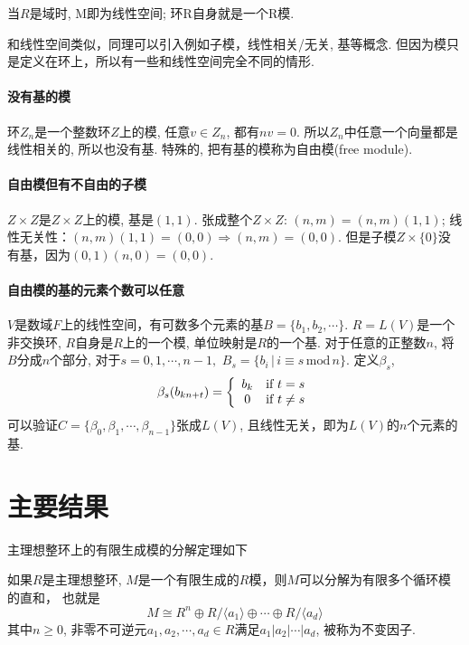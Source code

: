 \begin{remark}
	当$R$是域时, M即为线性空间; 环R自身就是一个R模.
\end{remark}

和线性空间类似，同理可以引入例如子模，线性相关/无关, 基等概念.
但因为模只是定义在环上，所以有一些和线性空间完全不同的情形.

\paragraph{没有基的模}
环$Z_n$是一个整数环$Z$上的模, 任意$v \in Z_n$, 都有$nv = 0$.
所以$Z_n$中任意一个向量都是线性相关的, 所以也没有基.
特殊的, 把有基的模称为自由模(free module).

\paragraph{自由模但有不自由的子模}
$Z\times Z$是$Z \times Z$上的模, 基是$(1,1)$.
张成整个$Z\times Z$: $(n,m)=(n,m)(1,1)$;
线性无关性：$(n,m)(1,1)=(0,0) \Rightarrow (n,m)=(0,0)$.
但是子模$Z \times \{0\}$没有基，因为$(0,1)(n,0) = (0,0)$.

\paragraph{自由模的基的元素个数可以任意}
$V$是数域$F$上的线性空间，有可数多个元素的基$B = \{b_1, b_2, \cdots\}$.
$R=L(V)$是一个非交换环, $R$自身是$R$上的一个模, 单位映射是$R$的一个基.
对于任意的正整数$n$, 将$B$分成$n$个部分, 对于$s=0,1,\cdots,n-1,$ 
$B_s = \{b_i \,|\, i \equiv s \,\mathrm{mod}\, n\}$.
定义$\beta_s$,
\begin{equation}
\nonumber
\beta_s(b_{kn+t}) = 
\left\{
\begin{array}[]{cc}
	b_k& \text{if } t = s\\
	0  & \text{if } t \ne s\\
\end{array}
\right.
\end{equation}
可以验证$C=\{\beta_0, \beta_1, \cdots, \beta_{n-1}\}$张成$L(V)$,
且线性无关，即为$L(V)$的$n$个元素的基.

\section{主要结果}
主理想整环上的有限生成模的分解定理如下
\begin{theorem}
如果$R$是主理想整环, $M$是一个有限生成的$R$模，则$M$可以分解为有限多个循环模的直和，
也就是
\begin{equation}
M \cong R^n \oplus R/\langle a_1 \rangle \oplus \cdots 
\oplus R/\langle a_d \rangle
\label{equ:decomp_0}
\end{equation}
其中$n\ge 0$, 非零不可逆元$a_1,a_2,\cdots, a_d \in R$满足$a_1|a_2|\cdots |a_d$,
被称为不变因子.
\end{theorem}

